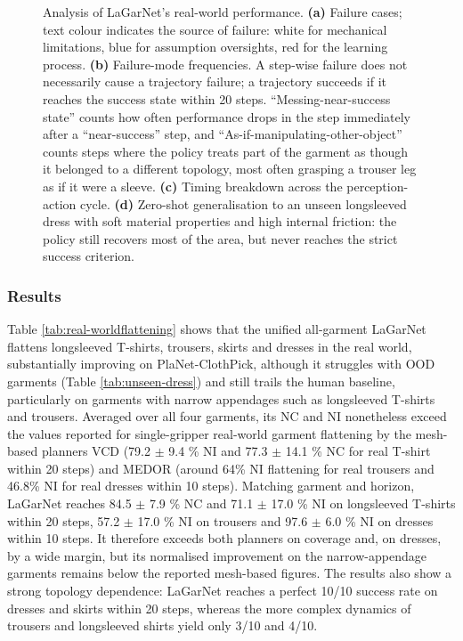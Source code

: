 \documentclass[journal]{IEEEtran}
\newif\ifshowrev\showrevtrue
\newcommand{\rev}[1]{\ifshowrev\textcolor{revblue}{#1}\else#1\fi}
\newif\ifshowirev\showirevtrue
\newcommand{\irev}[1]{\ifshowirev\textcolor{irevgreen}{#1}\else#1\fi}
\newif\ifshowrrev\showrrevtrue
\newcommand{\rrev}[1]{\ifshowrrev\textcolor{rrevred}{#1}\else#1\fi}
\begin{document}
\begin{figure}[t!]
    \caption{\rev{Analysis of LaGarNet's real-world performance. \textbf{(a)} Failure cases; text colour indicates the source of failure: white for mechanical limitations, blue for assumption oversights, red for the learning process. \textbf{(b)} Failure-mode frequencies. A step-wise failure does not necessarily cause a trajectory failure; a trajectory succeeds if it reaches the success state within 20 steps. ``Messing-near-success state'' counts how often performance drops in the step immediately after a ``near-success'' step, \irev{and ``As-if-manipulating-other-object'' counts steps where the policy treats part of the garment as though it belonged to a different topology, most often grasping a trouser leg as if it were a sleeve.} \textbf{(c)} Timing breakdown across the perception-action cycle. \textbf{(d)} Zero-shot generalisation to an unseen longsleeved dress with soft material properties and high internal friction\irev{: the policy still recovers most of the area, but never reaches the strict success criterion}.}}
    \label{fig:real_world_analysis}
\end{figure}

\subsubsection{Results}
\rev{Table \ref{tab:real-worldflattening} shows that the unified all-garment LaGarNet flattens longsleeved T-shirts, trousers, skirts and dresses in the real world, substantially improving on PlaNet-ClothPick, although it struggles with OOD garments (Table \ref{tab:unseen-dress}) and still trails the human baseline, particularly on garments with narrow appendages such as longsleeved T-shirts and trousers. \irev{Averaged over all four garments, its NC and NI nonetheless exceed the values reported for single-gripper real-world garment flattening by the mesh-based planners VCD \cite{lin2022learning} (79.2 $\pm$ 9.4 \% NI and 77.3 $\pm$ 14.1 \% NC for real T-shirt within 20 steps) and MEDOR \cite{huang2022mesh} (around 64\% NI flattening for real trousers and 46.8\% NI for real dresses within 10 steps).} \rrev{Matching garment and horizon, LaGarNet reaches 84.5 $\pm$ 7.9 \% NC and 71.1 $\pm$ 17.0 \% NI on longsleeved T-shirts within 20 steps, 57.2 $\pm$ 17.0 \% NI on trousers and 97.6 $\pm$ 6.0 \% NI on dresses within 10 steps. It therefore exceeds both planners on coverage and, on dresses, by a wide margin, but its normalised improvement on the narrow-appendage garments remains below the reported mesh-based figures.} The results also show a strong topology dependence: LaGarNet reaches a perfect 10/10 success rate on dresses and skirts within 20 steps, whereas the more complex dynamics of trousers and longsleeved shirts yield only 3/10 and 4/10.}
\end{document}
